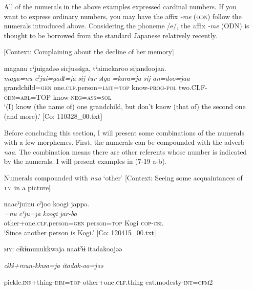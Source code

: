   All of the numerals in the above examples expressed cardinal numbers. If you want to express ordinary numbers, you may have the affix \textit{{}-me} (\textsc{odn}) follow the numerals introduced above. Considering the phoneme /e/, the affix \textit{{}-me} (ODN) is thought to be borrowed from the standard Japanese relatively recently.

\ea \label{ex:7:18}  [Context: Complaining about the decline of her memory]

\glll  maganu  cˀjuigadəə  sicjussɨga,   tˀaimekaroo  sijandoojaa.\\
\textit{maga=nu}  \textit{cˀjui=gadɨ=ja}  \textit{sij-tur-sɨga}  \textit{=kara=ja}  \textit{sij-an=doo=jaa}\\
grandchild=\textsc{gen}  one.\textsc{clf}.person=\textsc{lmt}=\textsc{top}  know-\textsc{prog}-\textsc{pol}            two.CLF-\textsc{odn}=\textsc{abl}=TOP  know-\textsc{neg}=\textsc{ass}=\textsc{sol}\\
\glt ‘(I) know (the name of) one grandchild, but don’t know (that of) the second one (and more).’ [Co: 110328\_00.txt]
\z

Before concluding this section, I will present some combinations of the numerals with a few morphemes. First, the numerals can be compounded with the adverb \textit{naa}. The combination means there are other referents whose number is indicated by the numerals. I will present examples in (7-19 a-b).

\ea \label{ex:7:19}  Numerals compounded with \textit{naa} ‘other’
\ea \label{ex:7:19a}[Context: Seeing some acquaintances of \textsc{tm} in a picture]

\glll  naacˀjuinu  cˀjoo  koogi  jappa.\\
\textit{=nu}  \textit{cˀju=ja}  \textit{koogi}  \textit{jar-ba}\\
other+one.\textsc{clf}.person=\textsc{gen}  person=\textsc{top}  Kogi  \textsc{cop}-\textsc{csl}\\
\glt ‘Since another person is Kogi.’ [Co: 120415\_00.txt]

\ex \label{ex:7:19b}\textsc{my}:  cɨkɨmunukkwaja  naatˀɨɨ  {\textbar}itadak{\textbar}oojəə

      \textit{cɨkɨ+mun-kkwa=ja}  \textit{}  \textit{itadak-oo=jəə}

      pickle.\textsc{inf}+thing-\textsc{dim}=\textsc{top}  other+one.\textsc{clf}.thing  eat.modesty-\textsc{int}=\textsc{cfm}2

